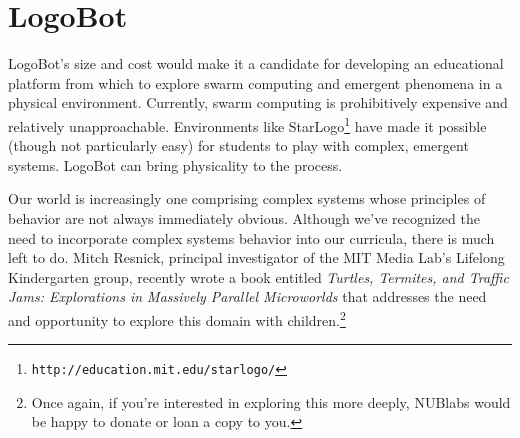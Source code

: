 \documentclass[10pt]{article}
\begin{document}
\begin{figure}
\centering
{}
\end{figure}

\section{LogoBot}
LogoBot's size and cost would make it a candidate for developing an educational platform from which to explore swarm computing and emergent phenomena in a physical environment.  Currently, swarm computing is prohibitively expensive and relatively unapproachable.  Environments like StarLogo\footnote{\texttt{http://education.mit.edu/starlogo/}} have made it possible (though not particularly easy) for students to play with complex, emergent systems.  LogoBot can bring physicality to the process.

Our world is increasingly one comprising complex systems whose principles of behavior are not always immediately obvious.  Although we've recognized the need to incorporate complex systems behavior into our curricula, there is much left to do.  Mitch Resnick, principal investigator of the MIT Media Lab's Lifelong Kindergarten group, recently wrote a book entitled \textit{Turtles, Termites, and Traffic Jams: Explorations in Massively Parallel Microworlds} that addresses the need and opportunity to explore this domain with children.\footnote{Once again, if you're interested in exploring this more deeply, NUBlabs would be happy to donate or loan a copy to you.}
\end{document}
